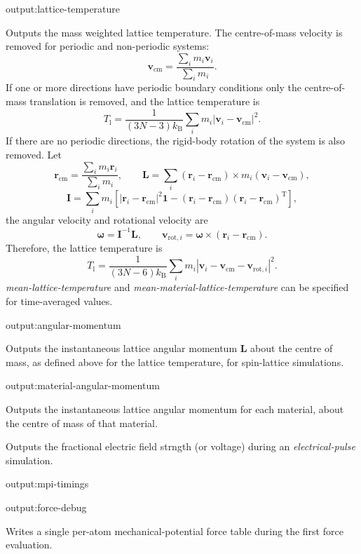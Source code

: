 {\zicf output:lattice-temperature}
Outputs the mass weighted lattice temperature. The centre-of-mass velocity is removed for periodic and non-periodic systems:
\[
\mathbf{v}_{\mathrm{cm}}=\frac{\sum_i m_i\mathbf{v}_i}{\sum_i m_i}.
\]
If one or more directions have periodic boundary conditions only the centre-of-mass translation is removed, and the lattice temperature is
\[
T_{\mathrm{l}}=\frac{1}{(3N-3)k_{\mathrm B}}
\sum_i m_i\left|\mathbf{v}_i-\mathbf{v}_{\mathrm{cm}}\right|^2.
\]
If there are no periodic directions, the rigid-body rotation of the system is also removed. Let
\[
\mathbf{r}_{\mathrm{cm}}=\frac{\sum_i m_i\mathbf{r}_i}{\sum_i m_i},\qquad
\mathbf{L}=\sum_i(\mathbf{r}_i-\mathbf{r}_{\mathrm{cm}})\times
m_i(\mathbf{v}_i-\mathbf{v}_{\mathrm{cm}}),
\]
\[
\mathbf{I}=\sum_i m_i\left[
|\mathbf{r}_i-\mathbf{r}_{\mathrm{cm}}|^2\mathbf{1}
-(\mathbf{r}_i-\mathbf{r}_{\mathrm{cm}})(\mathbf{r}_i-\mathbf{r}_{\mathrm{cm}})^{\mathrm T}
\right],
\]
the angular velocity and rotational velocity are
\[
\boldsymbol{\omega}=\mathbf{I}^{-1}\mathbf{L},\qquad
\mathbf{v}_{\mathrm{rot},i}=\boldsymbol{\omega}\times
(\mathbf{r}_i-\mathbf{r}_{\mathrm{cm}}).
\]
Therefore, the lattice temperature is
\[
T_{\mathrm{l}}=\frac{1}{(3N-6)k_{\mathrm B}}
\sum_i m_i\left|\mathbf{v}_i-\mathbf{v}_{\mathrm{cm}}-\mathbf{v}_{\mathrm{rot},i}\right|^2.
\]
\textit{mean-lattice-temperature} and \textit{mean-material-lattice-temperature} can be specified for time-averaged values.

{\zicf output:angular-momentum}
Outputs the instantaneous lattice angular momentum $\mathbf{L}$ about the centre of mass, as defined above for the lattice temperature, for spin-lattice simulations.

{\zicf output:material-angular-momentum}
Outputs the instantaneous lattice angular momentum for each material, about the centre of mass of that material.



Outputs the fractional electric field strngth (or voltage) during an \textit{electrical-pulse} simulation.

{\zicf output:mpi-timings}

{\zicf output:force-debug} Writes a single per-atom mechanical-potential force table during the first force evaluation. 

